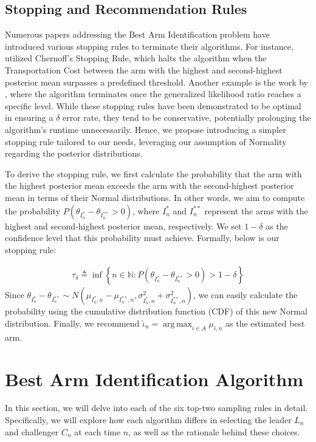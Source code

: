 \documentclass[a4paper, 12pt]{article}
\DeclareMathOperator{\argmax}{arg\,max}
\theoremstyle{definition}
\begin{document}
\subsection{Stopping and Recommendation Rules}
Numerous papers addressing the Best Arm Identification problem have introduced various stopping rules to terminate their algorithms. For instance, \cite{ttei} utilized Chernoff's Stopping Rule, which halts the algorithm when the Transportation Cost between the arm with the highest and second-highest posterior mean surpasses a predefined threshold. Another example is the work by \cite{ttucb2}, where the algorithm terminates once the generalized likelihood ratio reaches a specific level. While these stopping rules have been demonstrated to be optimal in ensuring a $\delta$ error rate, they tend to be conservative, potentially prolonging the algorithm's runtime unnecessarily. Hence, we propose introducing a simpler stopping rule tailored to our needs, leveraging our assumption of Normality regarding the posterior distributions.

To derive the stopping rule, we first calculate the probability that the arm with the highest posterior mean exceeds the arm with the second-highest posterior mean in terms of their Normal distributions. In other words, we aim to compute the probability $P\left(\theta_{I_n^*}-\theta_{I_n^{**}} > 0\right)$, where $I_n^*$ and $I_n^{**}$ represent the arms with the highest and second-highest posterior mean, respectively. We set $1-\delta$ as the confidence level that this probability must achieve. Formally, below is our stopping rule:

\begin{align} \label{eq:stop}
\tau_\delta\triangleq \inf\left\{n\in\mathbb{N}:P\left(\theta_{I_n^*}-\theta_{I_n^{**}} > 0\right) > 1-\delta\right\}
\end{align}
Since $\theta_{I_n^*}-\theta_{I_n^{**}} \sim N\left(\mu_{{I_n^*},n} - \mu_{{I_n^{**}},n},\sigma_{{I_n^*},n}^2 + \sigma_{{I_n^{**}},n}^2\right)$, we can easily calculate the probability using the cumulative distribution function (CDF) of this new Normal distribution. Finally, we recommend $\hat{\iota}_n = \argmax_{i\in A} \mu_{i,n}$ as the estimated best arm.



\section{Best Arm Identification Algorithm} \label{sec:algo}
In this section, we will delve into each of the six top-two sampling rules in detail. Specifically, we will explore how each algorithm differs in selecting the leader $L_n$ and challenger $C_n$ at each time $n$, as well as the rationale behind these choices.
\end{document}
